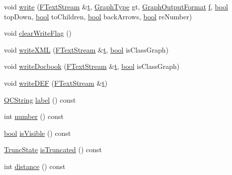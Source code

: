 \begin{DoxyCompactItemize}
\item 
void \hyperlink{class_dot_node_abdfe5f258dbce6472e7c3d19d5790e13}{write} (\hyperlink{class_f_text_stream}{F\+Text\+Stream} \&\hyperlink{058__bracket__recursion_8tcl_a69e959f6901827e4d8271aeaa5fba0fc}{t}, \hyperlink{class_dot_node_ac4e8b27d54919cd0afa73f4c8c7d569c}{Graph\+Type} gt, \hyperlink{dot_8h_ac60ef98d62b78366a17c9f1bda96523f}{Graph\+Output\+Format} \hyperlink{060__command__switch_8tcl_af6830d2c644b45088ea8f1f74a46b778}{f}, \hyperlink{qglobal_8h_a1062901a7428fdd9c7f180f5e01ea056}{bool} top\+Down, \hyperlink{qglobal_8h_a1062901a7428fdd9c7f180f5e01ea056}{bool} to\+Children, \hyperlink{qglobal_8h_a1062901a7428fdd9c7f180f5e01ea056}{bool} back\+Arrows, \hyperlink{qglobal_8h_a1062901a7428fdd9c7f180f5e01ea056}{bool} re\+Number)
\item 
void \hyperlink{class_dot_node_a27692f33c86a577ad85ab7176539d4de}{clear\+Write\+Flag} ()
\item 
void \hyperlink{class_dot_node_a464ac9eb20e6e99d33113aada31850b3}{write\+X\+M\+L} (\hyperlink{class_f_text_stream}{F\+Text\+Stream} \&\hyperlink{058__bracket__recursion_8tcl_a69e959f6901827e4d8271aeaa5fba0fc}{t}, \hyperlink{qglobal_8h_a1062901a7428fdd9c7f180f5e01ea056}{bool} is\+Class\+Graph)
\item 
void \hyperlink{class_dot_node_a41493056afa14c885fbd66b090ce6f91}{write\+Docbook} (\hyperlink{class_f_text_stream}{F\+Text\+Stream} \&\hyperlink{058__bracket__recursion_8tcl_a69e959f6901827e4d8271aeaa5fba0fc}{t}, \hyperlink{qglobal_8h_a1062901a7428fdd9c7f180f5e01ea056}{bool} is\+Class\+Graph)
\item 
void \hyperlink{class_dot_node_ac3caa4673ba1c6325c1763985ceb4481}{write\+D\+E\+F} (\hyperlink{class_f_text_stream}{F\+Text\+Stream} \&\hyperlink{058__bracket__recursion_8tcl_a69e959f6901827e4d8271aeaa5fba0fc}{t})
\item 
\hyperlink{class_q_c_string}{Q\+C\+String} \hyperlink{class_dot_node_a505acc4dda739efc880b145c669777ae}{label} () const 
\item 
int \hyperlink{class_dot_node_aaf3ef93e96036236942d01080a236b8a}{number} () const 
\item 
\hyperlink{qglobal_8h_a1062901a7428fdd9c7f180f5e01ea056}{bool} \hyperlink{class_dot_node_af4232acaf4c971329f2ab820887b9c65}{is\+Visible} () const 
\item 
\hyperlink{class_dot_node_ac40de94762a7659599b2056942373102}{Trunc\+State} \hyperlink{class_dot_node_a3e29ef79bc93c7ac0f2d540568e96411}{is\+Truncated} () const 
\item 
int \hyperlink{class_dot_node_a4ba999c8282983b5daf7b328d607676e}{distance} () const 
\end{DoxyCompactItemize}
